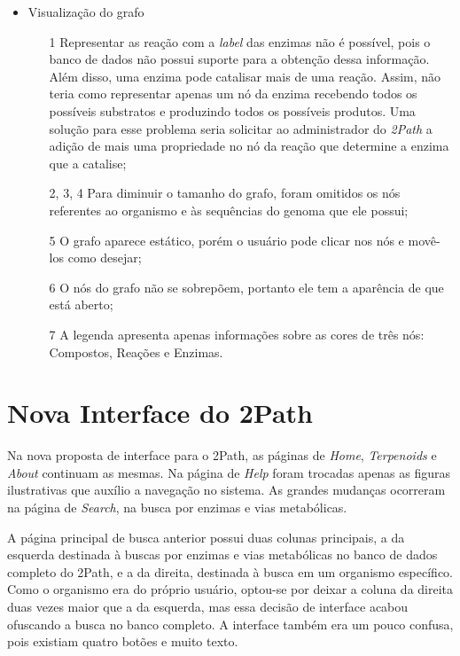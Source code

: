 \begin{itemize}
\item Visualização do grafo
  \begin{itemize} 
  \item[1] Representar as reação com a \textit{label} das enzimas não é possível, pois o banco de dados não possui suporte para a obtenção dessa informação. Além disso, uma enzima pode catalisar mais de uma reação. Assim, não teria como representar apenas um nó da enzima recebendo todos os possíveis substratos e produzindo todos os possíveis produtos. Uma solução para esse problema seria solicitar ao administrador do \textit{2Path} a adição de mais uma propriedade no nó da reação que determine a enzima que a catalise;
  \item[2, 3, 4] Para diminuir o tamanho do grafo, foram omitidos os nós referentes ao organismo e às sequências do genoma que ele possui;
  \item[5] O grafo aparece estático, porém o usuário pode clicar nos nós e movê-los como desejar;
  \item[6] O nós do grafo não se sobrepõem, portanto ele tem a aparência de que está aberto;
  \item[7] A legenda apresenta apenas informações sobre as cores de três nós: Compostos, Reações e Enzimas.
  \end{itemize}
\end{itemize}
 
 
\newpage
\section{Nova Interface do 2Path} \label{novaInterface}

\indent Na nova proposta de interface para o 2Path, as páginas de \textit{Home}, \textit{Terpenoids} e \textit{About} continuam as mesmas. Na página de \textit{Help} foram trocadas apenas as figuras ilustrativas que auxílio a navegação no sistema. As grandes mudanças ocorreram na página de \textit{Search}, na busca por enzimas e vias metabólicas.

\indent A página principal de busca anterior possui duas colunas principais, a da esquerda destinada à buscas por enzimas e vias metabólicas no banco de dados completo do 2Path, e a da direita, destinada à busca em um organismo específico. Como o organismo era do próprio usuário, optou-se por deixar a coluna da direita duas vezes maior que a da esquerda, mas essa decisão de interface acabou ofuscando a busca no banco completo. A interface também era um pouco confusa, pois existiam quatro botões e muito texto.

